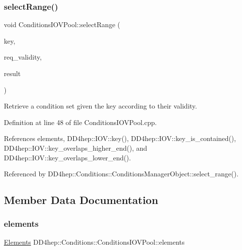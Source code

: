 \subsubsection{\texorpdfstring{select\+Range()}{selectRange()}}
{\footnotesize\ttfamily void Conditions\+I\+O\+V\+Pool\+::select\+Range (\begin{DoxyParamCaption}\item[{\hyperlink{class_d_d4hep_1_1_conditions_1_1_condition_a7528efa762e8cc072ef80ea67c3531f9}{Condition\+::key\+\_\+type}}]{key,  }\item[{const \hyperlink{class_d_d4hep_1_1_conditions_1_1_condition_ad84300e226b2085ec5e9db7f47be5539}{Condition\+::iov\+\_\+type} \&}]{req\+\_\+validity,  }\item[{\hyperlink{namespace_d_d4hep_1_1_conditions_ae765f0140a33973a430280f02b6062f4}{Range\+Conditions} \&}]{result }\end{DoxyParamCaption})}



Retrieve a condition set given the key according to their validity. 



Definition at line 48 of file Conditions\+I\+O\+V\+Pool.\+cpp.



References elements, D\+D4hep\+::\+I\+O\+V\+::key(), D\+D4hep\+::\+I\+O\+V\+::key\+\_\+is\+\_\+contained(), D\+D4hep\+::\+I\+O\+V\+::key\+\_\+overlaps\+\_\+higher\+\_\+end(), and D\+D4hep\+::\+I\+O\+V\+::key\+\_\+overlaps\+\_\+lower\+\_\+end().



Referenced by D\+D4hep\+::\+Conditions\+::\+Conditions\+Manager\+Object\+::select\+\_\+range().



\subsection{Member Data Documentation}
\hypertarget{class_d_d4hep_1_1_conditions_1_1_conditions_i_o_v_pool_adf0b418e513769d438a8c91d766e86f4}{}\label{class_d_d4hep_1_1_conditions_1_1_conditions_i_o_v_pool_adf0b418e513769d438a8c91d766e86f4} 
\subsubsection{\texorpdfstring{elements}{elements}}
{\footnotesize\ttfamily \hyperlink{class_d_d4hep_1_1_conditions_1_1_conditions_i_o_v_pool_aa011c5cc19bfb761be62adf9a88b5ee9}{Elements} D\+D4hep\+::\+Conditions\+::\+Conditions\+I\+O\+V\+Pool\+::elements}



